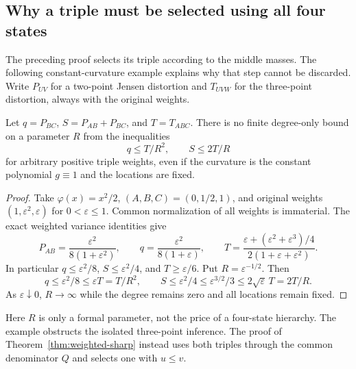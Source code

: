 \subsection{Why a triple must be selected using all four states}
\label{sec:triple-caution}
The preceding proof selects its triple according to the middle masses.
The following constant-curvature example explains why that step cannot
be discarded. Write $P_{UV}$ for a two-point Jensen distortion and
$T_{UVW}$ for the three-point distortion, always with the original weights.

\begin{proposition}
Let $q=P_{BC}$, $S=P_{AB}+P_{BC}$, and $T=T_{ABC}$. There is no finite
degree-only bound on a parameter $R$ from the inequalities
\[
 q\leq T/R^2,\qquad S\leq2T/R
\]
for arbitrary positive triple weights, even if the curvature is the
constant polynomial $g\equiv1$ and the locations are fixed.
\end{proposition}
\begin{proof}
Take $\varphi(x)=x^2/2$, $(A,B,C)=(0,1/2,1)$, and original weights
$(1,\varepsilon^2,\varepsilon)$ for $0<\varepsilon\leq1$.
Common normalization of all weights is immaterial. The exact weighted
variance identities give
\[
 P_{AB}=\frac{\varepsilon^2}{8(1+\varepsilon^2)},\qquad
 q=\frac{\varepsilon^2}{8(1+\varepsilon)},\qquad
 T=\frac{\varepsilon+(\varepsilon^2+\varepsilon^3)/4}
          {2(1+\varepsilon+\varepsilon^2)}.
\]
In particular $q\leq\varepsilon^2/8$, $S\leq\varepsilon^2/4$, and
$T\geq\varepsilon/6$. Put $R=\varepsilon^{-1/2}$. Then
\[
 q\leq\varepsilon^2/8\leq\varepsilon T=T/R^2,
 \qquad
 S\leq\varepsilon^2/4\leq\varepsilon^{3/2}/3
    \leq2\sqrt\varepsilon\,T=2T/R.
\]
As $\varepsilon\downarrow0$, $R\to\infty$ while the degree remains
zero and all locations remain fixed.
\end{proof}


Here $R$ is only a formal parameter, not the price of a four-state
hierarchy. The example obstructs the isolated three-point inference.
The proof of Theorem~\ref{thm:weighted-sharp} instead uses both triples
through the common denominator $Q$ and selects one with $u\le v$.
